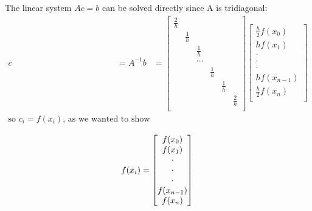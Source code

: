 \documentclass[a4paper,10pt]{article}
\begin{document}
The linear system $Ac = b$ can be solved directly since A is tridiagonal:
\begin{align*}
 c &= A^{-1}b &= 
 \begin{bmatrix}
 \frac{2}{h}\\ 
 & \frac{1}{h}\\
 & & \frac{1}{h}\\
 & & \cdots\\
 & & & \frac{1}{h} \\
 & & & & \frac{1}{h} \\
 & & & & & \frac{2}{h} \\
 \end{bmatrix}
 \begin{bmatrix}
 \frac{h}{2} f(x_0) \\ 
 h f(x_1) \\
 \cdot \\ \cdot \\ \cdot \\ 
 h f(x_{n-1}) \\ 
 \frac{h}{2} f(x_n) \\
 \end{bmatrix}\\
 \text{so } c_i = f(x_i) \text{, as we wanted to show because:}
\end{align*}

\begin{equation}
f(x_{i}) =  
 \begin{bmatrix}
 f(x_0) \\ 
 f(x_1) \\
 \cdot \\ \cdot \\ \cdot \\ 
  f(x_{n-1}) \\ 
  f(x_n) 
 \end{bmatrix} \\
\end{equation}
\end{document}
